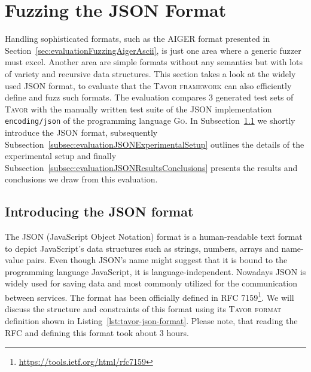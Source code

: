 \afterpage{\clearpage}

\section{Fuzzing the JSON Format}
\label{sec:evaluationJSON}

Handling sophisticated formats, such as the AIGER format presented in Section~\ref{sec:evaluationFuzzingAigerAscii}, is just one area where a generic fuzzer must excel. Another area are simple formats without any semantics but with lots of variety and recursive data structures. This section takes a look at the widely used JSON format, to evaluate that the \textsc{Tavor framework} can also efficiently define and fuzz such formats. The evaluation compares 3 generated test sets of \textsc{Tavor} with the manually written test suite of the JSON implementation \texttt{encoding/json} of the programming language \textsc{Go}. In Subsection~\ref{subsec:evaluationIntroducingJSONFormat} we shortly introduce the JSON format, subsequently Subsection~\ref{subsec:evaluationJSONExperimentalSetup} outlines the details of the experimental setup and finally Subsection~\ref{subsec:evaluationJSONResultsConclusions} presents the results and conclusions we draw from this evaluation.

\subsection{Introducing the JSON format}
\label{subsec:evaluationIntroducingJSONFormat}

The JSON (JavaScript Object Notation) format is a human-readable text format to depict JavaScript's data structures such as strings, numbers, arrays and name-value pairs. Even though JSON's name might suggest that it is bound to the programming language JavaScript, it is language-independent. Nowadays JSON is widely used for saving data and most commonly utilized for the communication between services. The format has been officially defined in RFC 7159\footnote{\url{https://tools.ietf.org/html/rfc7159}}. We will discuss the structure and constraints of this format using its \textsc{Tavor format} definition shown in Listing~\ref{lst:tavor-json-format}. Please note, that reading the RFC and defining this format took about 3 hours.

